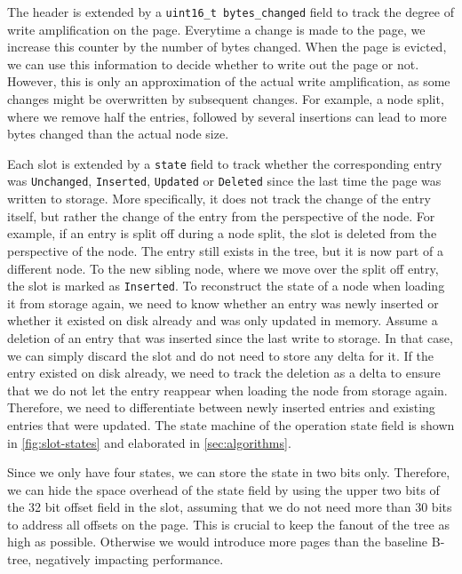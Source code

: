 The header is extended by a \texttt{uint16\_t bytes\_changed} field to track the degree of write amplification on the page.
Everytime a change is made to the page, we increase this counter by the number of bytes changed.
When the page is evicted, we can use this information to decide whether to write out the page or not.
However, this is only an approximation of the actual write amplification, as some changes might be overwritten by subsequent changes.
For example, a node split, where we remove half the entries, followed by several insertions can lead to more bytes changed than the actual node size.

Each slot is extended by a \texttt{state} field to track whether the corresponding entry was \texttt{Unchanged}, \texttt{Inserted}, \texttt{Updated} or \texttt{Deleted} since the last time the page was written to storage.
More specifically, it does not track the change of the entry itself, but rather the change of the entry from the perspective of the node.
For example, if an entry is split off during a node split, the slot is deleted from the perspective of the node.
The entry still exists in the tree, but it is now part of a different node.
To the new sibling node, where we move over the split off entry, the slot is marked as \texttt{Inserted}.
To reconstruct the state of a node when loading it from storage again, we need to know whether an entry was newly inserted or whether it existed on disk already and was only updated in memory.
Assume a deletion of an entry that was inserted since the last write to storage.
In that case, we can simply discard the slot and do not need to store any delta for it.
If the entry existed on disk already, we need to track the deletion as a delta to ensure that we do not let the entry reappear when loading the node from storage again.
Therefore, we need to differentiate between newly inserted entries and existing entries that were updated.
The state machine of the operation state field is shown in \autoref{fig:slot-states} and elaborated in \autoref{sec:algorithms}.

Since we only have four states, we can store the state in two bits only.
Therefore, we can hide the space overhead of the state field by using the upper two bits of the 32 bit offset field in the slot, assuming that we do not need more than 30 bits to address all offsets on the page.
This is crucial to keep the fanout of the tree as high as possible. Otherwise we would introduce more pages than the baseline B-tree, negatively impacting performance.

